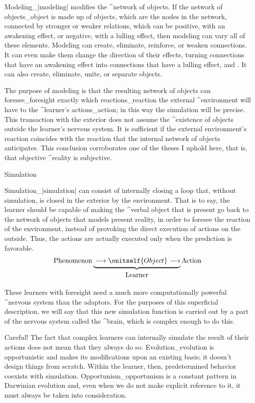 Modeling_|modeling| modifies the ^{network of objects}. If the network
of objects_{object} is made up of objects, which are the nodes in the
network, connected by stronger or weaker relations, which can be
positive, with an awakening effect, or negative, with a lulling effect,
then modeling can vary all of these elements. Modeling can create,
eliminate, reinforce, or weaken connections. It can even make them
change the direction of their effects, turning connections that have an
awakening effect into connections that have a lulling effect, and
. It can also create, eliminate, unite, or separate
objects.

The purpose of modeling is that the resulting network of objects can
foresee_{foresight} exactly which reactions_{reaction} the external
^{environment} will have to the ^{learner}'s actions_{action}; in this
way the simulation will be precise. This transaction with the exterior
does not assume the ^{existence} of objects outside the learner's
nervous system. It is sufficient if the external environment's reaction
coincides with the reaction that the internal network of objects
anticipates. This conclusion corroborates one of the theses I uphold
here, that is, that objective ^{reality} is subjective.


\Section Simulation

Simulation_|simulation| can consist of internally closing a loop that,
without simulation, is closed in the exterior by the environment. That
is to say, the learner should be capable of making the ^{verbal object}
that is present go back to the network of objects that models present
reality, in order to foresee the reaction of the environment, instead of
provoking the direct execution of actions on the outside. Thus, the
actions are actually executed only when the prediction is favorable.
\abovedisplayskip=24pt
$$\hbox{Phenomenon}
   \underbrace{\strut
    \longrightarrow
    \onitself{\strut Object}
    \longrightarrow}_{\hbox{\strut Learner}}
  \hbox{Action}
$$
\abovedisplayskip=12pt

These learners with foresight need a much more computationally powerful
^{nervous system} than the adaptors. For the purposes of this
superficial description, we will say that this new simulation function
is carried out by a part of the nervous system called the ^{brain},
which is complex enough to do this.

Careful!  The fact that complex learners can internally simulate the
result of their actions does not mean that they always do so.
Evolution_{evolution} is opportunistic and makes its modifications upon
an existing basis; it doesn't design things from scratch. Within the
learner, then, predetermined behavior coexists with simulation.
Opportunism_{opportunism} is a constant pattern in Darwinian evolution
and, even when we do not make explicit reference to it, it must always
be taken into consideration.


